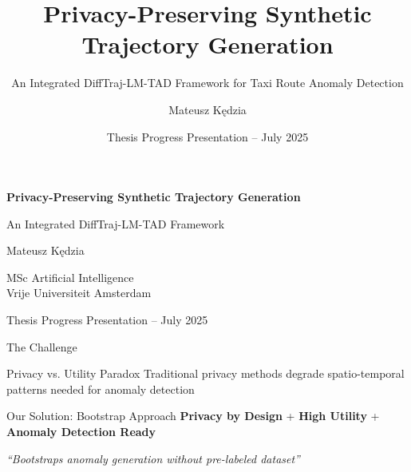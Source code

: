 \documentclass[aspectratio=169,xcolor={dvipsnames}]{beamer}
\title{Privacy-Preserving Synthetic Trajectory Generation}
\subtitle{An Integrated DiffTraj-LM-TAD Framework for Taxi Route Anomaly Detection}
\author{Mateusz Kędzia}
\institute{MSc Artificial Intelligence \\ Vrije Universiteit Amsterdam}
\date{Thesis Progress Presentation -- July 2025}
\begin{document}
\begin{frame}[plain]
  \vspace{1.5cm}
  \centering
  {\color{VUBlue}\Huge\textbf{Privacy-Preserving Synthetic Trajectory Generation}}
  
  \vspace{0.5em}
  {\color{RichGold}\Large An Integrated DiffTraj-LM-TAD Framework}
  
  \vspace{1.5em}
  {\large Mateusz Kędzia}
  
  \vspace{0.5em}
  {\normalsize MSc Artificial Intelligence \\ Vrije Universiteit Amsterdam}
  
  \vspace{1em}
  {\small Thesis Progress Presentation -- July 2025}
\end{frame}

\begin{frame}{The Challenge}
  \begin{alertblock}{Privacy vs. Utility Paradox}
    \centering
    \Large Traditional privacy methods degrade spatio-temporal patterns needed for anomaly detection \cite{buchholzSystematisationKnowledgeTrajectory2024}
  \end{alertblock}
  
  \vspace{1em}
  \begin{block}{Our Solution: Bootstrap Approach}
    \centering
    \textbf{Privacy by Design} + \textbf{High Utility} + \textbf{Anomaly Detection Ready}
    
    \vspace{0.5em}
    \textit{``Bootstraps anomaly generation without pre-labeled dataset''}
  \end{block}
\end{frame}
\end{document}
